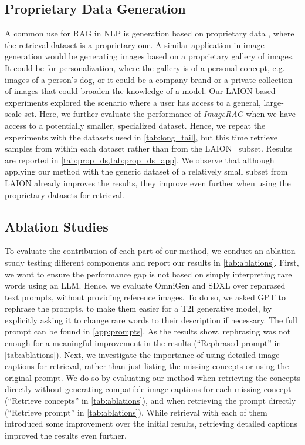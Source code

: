 \subsection{Proprietary Data Generation}

A common use for RAG in NLP is generation based on proprietary data \cite{lewis2020retrieval},
where the retrieval dataset is a proprietary one.
A similar application in image generation would be generating images based on a proprietary gallery of images. 
It could be for personalization, where the gallery is of a personal concept, e.g. images of a person's dog, or it could be a company brand or a private collection of images that could broaden the knowledge of a model.
Our LAION-based experiments explored the scenario where a user has access to a general, large-scale set. Here, we further evaluate the performance of \emph{ImageRAG} when we have access to a potentially smaller, specialized dataset. Hence, we repeat the experiments with the datasets used in \cref{tab:long_tail}, but this time retrieve samples from within each dataset rather than from the LAION~\cite{schuhmann2022laion} subset.
 Results are reported in \cref{tab:prop_ds,tab:prop_ds_app}.
 We observe that although applying our method with the generic dataset of a relatively small subset from LAION already improves the results, they improve even further when using the proprietary datasets for retrieval.

\vspace{-3pt}
\subsection{Ablation Studies}
\label{subsec:ablations}

To evaluate the contribution of each part of our method, we conduct an ablation study testing different components and report our results in \cref{tab:ablations}.
First, we want to ensure the performance gap is not based on simply interpreting rare words using an LLM. Hence, we evaluate OmniGen and SDXL over rephrased text prompts, without providing reference images. 
To do so, we asked GPT to rephrase the prompts, to make them easier for a T2I generative model, by explicitly asking it to change rare words to their description if necessary. The full prompt can be found in \cref{app:prompts}.
As the results show, rephrasing was not enough for a meaningful improvement in the results (``Rephrased prompt'' in \cref{tab:ablations}).
Next, we investigate the importance of using detailed image captions for retrieval, rather than just listing the missing concepts or using the original prompt. We do so by evaluating our method when retrieving the concepts directly without generating compatible image captions for each missing concept (``Retrieve concepts'' in \cref{tab:ablations}), and when retrieving the prompt directly (``Retrieve prompt'' in \cref{tab:ablations}). While retrieval with each of them introduced some improvement over the initial results, retrieving detailed captions improved the results even further.

